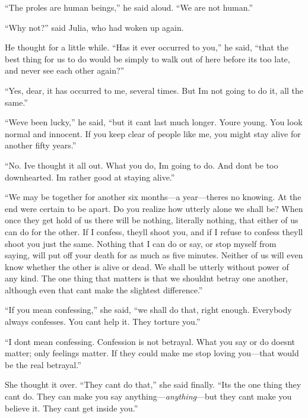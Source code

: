 ``The proles are human beings,'' he said aloud. ``We are not human.''

``Why not?'' said Julia, who had woken up again.

He thought for a little while. ``Has it ever occurred to you,'' he said,
``that the best thing for us to do would be simply to walk out of here
before it\textquotesingle s too late, and never see each other again?''

``Yes, dear, it has occurred to me, several times. But
I\textquotesingle m not going to do it, all the same.''

``We\textquotesingle ve been lucky,'' he said, ``but it
can\textquotesingle t last much longer. You\textquotesingle re young.
You look normal and innocent. If you keep clear of people like me, you
might stay alive for another fifty years.''

``No. I\textquotesingle ve thought it all out. What you do,
I\textquotesingle m going to do. And don\textquotesingle t be too
downhearted. I\textquotesingle m rather good at staying alive.''

``We may be together for another six months---a
year---there\textquotesingle s no knowing. At the end
we\textquotesingle re certain to be apart. Do you realize how utterly
alone we shall be? When once they get hold of us there will be nothing,
literally nothing, that either of us can do for the other. If I confess,
they\textquotesingle ll shoot you, and if I refuse to confess
they\textquotesingle ll shoot you just the same. Nothing that I can do
or say, or stop myself from saying, will put off your death for as much
as five minutes. Neither of us will even know whether the other is alive
or dead. We shall be utterly without power of any kind. The one thing
that matters is that we shouldn\textquotesingle t betray one another,
although even that can\textquotesingle t make the slightest difference.''

``If you mean confessing,'' she said, ``we shall do that, right enough.
Everybody always confesses. You can\textquotesingle t help it. They
torture you.''

``I don\textquotesingle t mean confessing. Confession is not betrayal.
What you say or do doesn\textquotesingle t matter; only feelings matter.
If they could make me stop loving you---that would be the real
betrayal.''

She thought it over. ``They can\textquotesingle t do that,'' she said
finally. ``It\textquotesingle s the one thing they can\textquotesingle t
do. They can make you say anything---\emph{anything}---but they
can\textquotesingle t make you believe it. They can\textquotesingle t
get inside you.''

